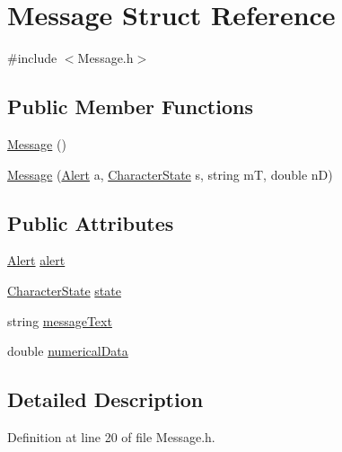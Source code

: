 \hypertarget{struct_message}{\section{Message Struct Reference}
\label{struct_message}
}


{\ttfamily \#include $<$Message.\-h$>$}

\subsection*{Public Member Functions}
\begin{DoxyCompactItemize}
\item 
\hyperlink{struct_message_a4fc4f717b634e66070366cb7722d7761}{Message} ()
\item 
\hyperlink{struct_message_a8d496fb4f3482bafef5cd8160913a154}{Message} (\hyperlink{_character_data_8h_a15800b6cb06470a71c1a4b4164d6e685}{Alert} a, \hyperlink{_character_data_8h_aacbb008a93d24b04a8779bbdbd8880b5}{Character\-State} s, string m\-T, double n\-D)
\end{DoxyCompactItemize}
\subsection*{Public Attributes}
\begin{DoxyCompactItemize}
\item 
\hyperlink{_character_data_8h_a15800b6cb06470a71c1a4b4164d6e685}{Alert} \hyperlink{struct_message_af130d06d1616c134306f8e1e6345dc51}{alert}
\item 
\hyperlink{_character_data_8h_aacbb008a93d24b04a8779bbdbd8880b5}{Character\-State} \hyperlink{struct_message_a3ef0ded0ac200012123a6864acae590b}{state}
\item 
string \hyperlink{struct_message_a2ac401576d2c546a76a606ebc4f25b5b}{message\-Text}
\item 
double \hyperlink{struct_message_acd1399cec6e65eabacd13e1d9962625b}{numerical\-Data}
\end{DoxyCompactItemize}


\subsection{Detailed Description}


Definition at line 20 of file Message.\-h.



